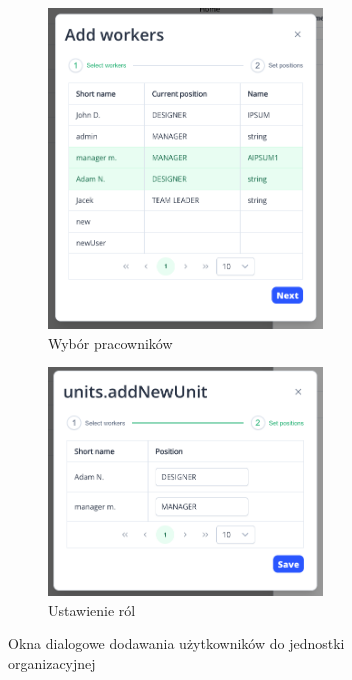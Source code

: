 \begin{figure}[H]
    \centering
    \begin{subfigure}[b]{0.49\textwidth}
        \centering
        \includegraphics[width=0.8\textwidth]{graf/front/selectWorkers.png}
        \caption{Wybór pracowników}
    \end{subfigure}
    \begin{subfigure}[b]{0.49\textwidth}
        \centering
        \includegraphics[width=0.8\textwidth]{graf/front/setPositions.png}
        \caption{Ustawienie ról}
    \end{subfigure}
    \caption{Okna dialogowe dodawania użytkowników do jednostki organizacyjnej}
    \label{fig:unitDialogs2}
\end{figure}


